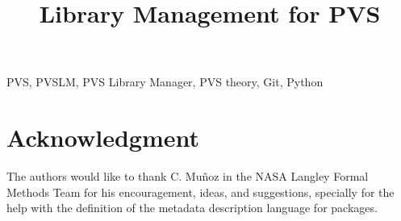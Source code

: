 \documentclass[journal,comsoc]{IEEEtran}
\begin{document}
\title{Library Management for PVS}

\author{
}

\maketitle



\begin{IEEEkeywords}
PVS, PVSLM, PVS Library Manager, PVS theory, Git, Python
\end{IEEEkeywords}

\IEEEpeerreviewmaketitle













\section*{Acknowledgment}
The authors would like to thank
C. Mu\~noz in the NASA Langley Formal Methods Team for his
encouragement, ideas, and suggestions, specially for the help with the
definition of the metadata description language for packages.

\ifCLASSOPTIONcaptionsoff
  \newpage
\fi



\end{document}
